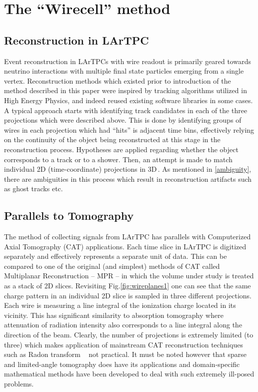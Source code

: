 \documentclass[a4paper]{jpconf}
\begin{document}
\section{The ``Wirecell'' method}
\subsection{Reconstruction in LArTPC}
Event reconstruction in LArTPCs with wire readout is primarily geared towards neutrino interactions
with multiple final state particles emerging from  a single vertex. 
Reconstruction methods which existed prior to introduction of the method described in this paper were inspired by tracking
algorithms utilized in High Energy Physics, and indeed reused existing software libraries
in some cases. A typical approach starts with identifying track candidates in each of the three projections which were described
above. This is done by identifying groups of wires in each projection which had ``hits'' is adjacent time bins, effectively relying
on the continuity of the object being reconstructed at this stage in the reconstruction process. Hypotheses are applied regarding
whether the object corresponds to a track or to a shower. Then, an attempt is made to match individual 2D (time-coordinate)
projections in 3D\,\cite{icarus}. As mentioned in \ref{ambiguity}, there are ambiguities in this process which result in
reconstruction artifacts such as ghost tracks etc.


\subsection{Parallels to Tomography}
The method of collecting signals from LArTPC has  parallels with Computerized Axial Tomography
(CAT) applications. Each time slice in LArTPC is
digitized separately and effectively represents a separate unit of data. This can be compared to one of the original (and simplest) methods of CAT
called Multiplanar Reconstruction -- MPR -- in which the volume under study is treated as a stack of 2D slices. Revisiting
Fig.\ref{fig:wireplanes1} one can see that the same charge pattern in an individual 2D slice is sampled in three different projections.
Each wire is  measuring a line integral of the ionization charge located in its vicinity. This has significant similarity
to absorption tomography where attenuation of radiation intensity also corresponds to a line integral along
the direction of the beam. Clearly, the number of projections is extremely limited (to three) which makes application of mainstream
CAT reconstruction techniques such as Radon transform ~\cite{radon1}
not practical. It must be noted however that sparse and limited-angle tomography
does have its applications and domain-specific mathematical methods have been developed to deal with such extremely ill-posed problems.
\end{document}

